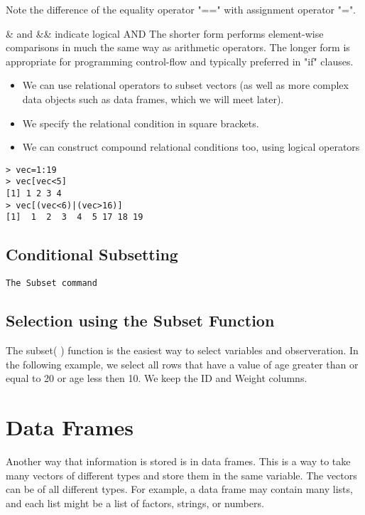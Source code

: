 \documentclass[a4paper,12pt]{article}
\begin{document}
Note the difference of the equality operator "==" with assignment operator "=".

\& and \&\& indicate logical AND %
The shorter form performs element-wise comparisons in much the same way as arithmetic operators. The longer form is appropriate for programming control-flow and typically preferred in "if" clauses.
\begin{itemize}
\item We can use relational operators to subset vectors (as well as more complex data objects such as data frames, which we will meet later).
\item We specify the  relational condition in square brackets.
\item We can construct compound relational conditions too, using logical operators
\end{itemize}
\begin{framed}
\begin{verbatim}
> vec=1:19
> vec[vec<5]
[1] 1 2 3 4
> vec[(vec<6)|(vec>16)]
[1]  1  2  3  4  5 17 18 19
\end{verbatim}
\end{framed}

\subsection{Conditional Subsetting}
 \texttt{The Subset command}
\subsection{Selection using the Subset Function}
The subset( ) function is the easiest way to select variables and observeration. In the following example, we select all rows that have a value of age greater than or equal to 20 or age less then 10. We keep the ID and Weight columns.


\section{Data Frames}


Another way that information is stored is in data frames. This is a way to take many vectors of different types and store them in the same variable. The vectors can be of all different types. For example, a data frame may contain many lists, and each list might be a list of factors, strings, or numbers.
\end{document}

